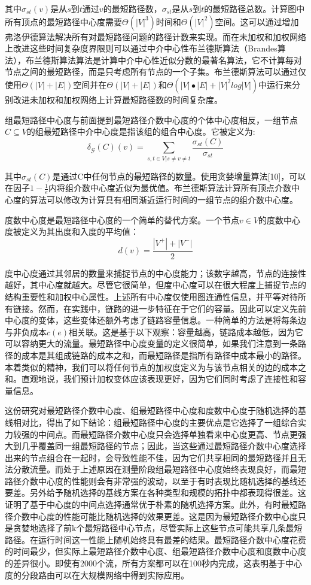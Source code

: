 其中$\sigma_{st}\left(v\right)$是从$s$到$t$通过$v$的最短路径数，$\sigma_{st}$是从$s$到$t$的最短路径总数。计算图中所有顶点的最短路径中心度需要$\Theta({|V|}^3)$时间和$\Theta({|V|}^2)$空间。这可以通过增加弗洛伊德算法解决所有对最短路径问题的路径计数来实现。而在未加权和加权网络上改进这些时间复杂度界限则可以通过中介中心性布兰德斯算法（Brandes算法），布兰德斯算法算法是计算中介中心性近似分数的最著名算法，它不计算每对节点之间的最短路径，而是只考虑所有节点的一个子集。布兰德斯算法可以通过仅使用$\Theta(|V|+|E|)$空间并在$\Theta(|V|+|E|)$和$\Theta(|V|\bullet|E|+{|V|}^2log|V|)$中运行来分别改进未加权和加权网络上计算最短路径数的时间复杂度。

组最短路径中心度与前面提到最短路径介数中心度的个体中心度相反，一组节点$C\subseteq V$的组最短路径中介中心度是指该组的组合中心度。它被定义为:
$$\delta_\mathcal{G}(C)\left(v\right)=\sum_{s,t\in V|s\neq v\neq t}\frac{\sigma_{st}\left(C\right)}{\sigma_{st}}$$

其中$\sigma_{st}\left(C\right)$是通过C中任何节点的最短路径的数量。使用贪婪增量算法[10]，可以在因子$1-\frac{1}{e}$内将组介数中心度近似为最优值。布兰德斯算法计算所有顶点介数中心度的算法可以修改为计算具有相同渐近运行时间的一组节点的组介数中心度。

度数中心度是最短路径中心度的一个简单的替代方案。一个节点$v \in V$的度数中心度被定义为其出度和入度的平均值：
$$d(v)=\frac{|V^+|+|V^-|}{2}$$

度中心度通过其邻居的数量来捕捉节点的中心度能力；该数字越高，节点的连接性越好，其中心度就越大。尽管它很简单，但度中心度可以在很大程度上捕捉节点的结构重要性和加权中心属性。上述所有中心度仅使用图连通性信息，并平等对待所有链接。然而，在实践中，链路的进一步特征在于它们的容量。因此可以定义先前中心度的变体，这些变体还额外考虑了链路容量信息。一种简单的方法是将每条边与非负成本$c(e)$相关联。这是基于以下观察：容量越高，链路成本越低，因为它可以容纳更大的流量。最短路径中心度变量的定义很简单，如果我们注意到一条路径的成本是其组成链路的成本之和，而最短路径是指所有路径中成本最小的路径。本着类似的精神，我们可以将任何节点的加权度定义为与该节点相关的边的成本之和。直观地说，我们预计加权变体应该表现更好，因为它们同时考虑了连接性和容量信息。

这份研究对最短路径介数中心度、组最短路径中心度和度数中心度于随机选择的基线相对比，得出了如下结论：组最短路径中心度的主要优点是它选择了一组综合实力较强的中间点。而最短路径介数中心度只会选择单独看来中心度更高、节点更强大到几乎覆盖同一组最短路径的节点；因此，当这些通过最短路径介数中心度选择出来的节点组合在一起时，会导致性能不佳，因为它们共享相同的最短路径并且无法分散流量。而处于上述原因在测量阶段组最短路径中心度始终表现良好，而最短路径介数中心度的性能则会有非常强的波动，以至于有时表现比随机选择的基线还要差。另外给予随机选择的基线方案在各种类型和规模的拓扑中都表现得很差。这证明了基于中心度的中间点选择通常优于朴素的随机选择方案。此外，有时最短路径介数中心度的性能可能比随机选择的效果更差。这是因为最短路径介数中心度只是贪婪地选择了前k个最短路径中心节点，尽管实际上这些节点可能共享几条最短路径。在运行时间这一性能上随机始终具有最差的结果。最短路径介数中心度花费的时间最少，但实际上最短路径介数中心度、组最短路径介数中心度和度数中心度的差异很小。即使有2000个流，所有方案都可以在100秒内完成，这表明基于中心度的分段路由可以在大规模网络中得到实际应用。

